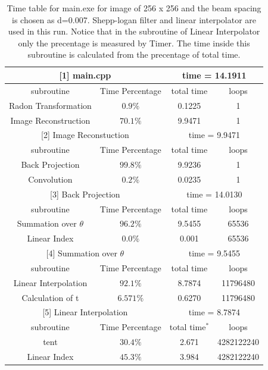 \begin{table}[htp]
\centering
\begin{tabular}{|c |c| c |c |}
 \hline
 \multicolumn{2}{|c|}{[1] main.cpp }& \multicolumn{2}{|c|}{ time = 14.1911 } \\
 \hline
subroutine & Time Percentage & total time & loops \\
 \hline
[6] Radon Transformation & $0.9\%$ & 0.1225 & 1\\
  \hline
[2] Image Reconstruction &  $70.1\%$ & 9.9471 & 1\\
 \hline
  \multicolumn{2}{|c|}{[2] Image Reconstuction }& \multicolumn{2}{|c|}{time = 9.9471} \\
 \hline
subroutine & Time Percentage & total time & loops \\
 \hline
[3] Back Projection & $99.8\%$ & 9.9236 & 1\\
  \hline
[7] Convolution &  $0.2\%$ & 0.0235 & 1\\
 \hline
   \multicolumn{2}{|c|}{[3] Back Projection  }& \multicolumn{2}{|c|}{time = 14.0130} \\
 \hline
 subroutine & Time Percentage & total time & loops \\
 \hline
[4] Summation over $\theta$ & $96.2\%$ & 9.5455 & 65536\\
  \hline
[8] Linear Index &  $0.0\%$ & 0.001 & 65536\\
 \hline
   \multicolumn{2}{|c|}{[4] Summation over $\theta$  }& \multicolumn{2}{|c|}{time = 9.5455} \\
 \hline
 subroutine & Time Percentage & total time & loops \\
 \hline
[5] Linear Interpolation & $92.1\%$ & 8.7874 & 11796480\\
  \hline
[8] Calculation of t &  $6.571\%$ & 0.6270 & 11796480\\
 \hline
    \multicolumn{2}{|c|}{[5] Linear Interpolation  }& \multicolumn{2}{|c|}{time = 8.7874} \\
 \hline
 subroutine & Time Percentage & total time$^*$ & loops \\
 \hline
[5] tent & $30.4\%$ & 2.671 & 4282122240\\
  \hline
[8] Linear Index &  $45.3\%$ & 3.984 & 4282122240\\
 \hline
\end{tabular}
\caption{Time table for main.exe for image of 256 x 256 and the beam spacing is chosen as d=0.007. Shepp-logan filter and linear interpolator are used in this run. Notice that in the subroutine of Linear Interpolator only the precentage is measured by Timer. The time inside this subroutine is calculated from the precentage of total time.}\label{table1}
\end{table}

